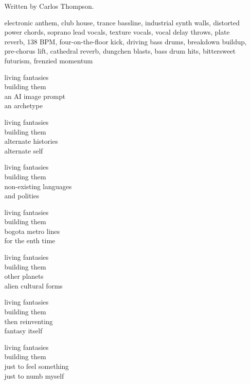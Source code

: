 
\label{sec:living-fantasies}
\begin{notes}
Written by Carlos Thompson.
\end{notes}
\begin{style}
electronic anthem, club house, trance bassline, industrial synth walls, distorted power chords, soprano lead vocals, texture vocals, vocal delay throws, plate reverb, 138 BPM, four-on-the-floor kick, driving bass drums, breakdown buildup, pre-chorus lift, cathedral reverb, dungchen blasts, bass drum hits, bittersweet futurism, frenzied momentum
\end{style}
\begin{lyrics}
living fantasies\\
building them\\
an AI image prompt\\
an archetype

living fantasies\\
building them\\
alternate histories\\
alternate self

living fantasies\\
building them\\
non-existing languages\\
and polities

living fantasies\\
building them\\
bogota metro lines\\
for the enth time

living fantasies\\
building them\\
other planets\\
alien cultural forms

living fantasies\\
building them\\
then reinventing\\
fantasy itself

living fantasies\\
building them\\
just to feel something\\
just to numb myself
\end{lyrics}

